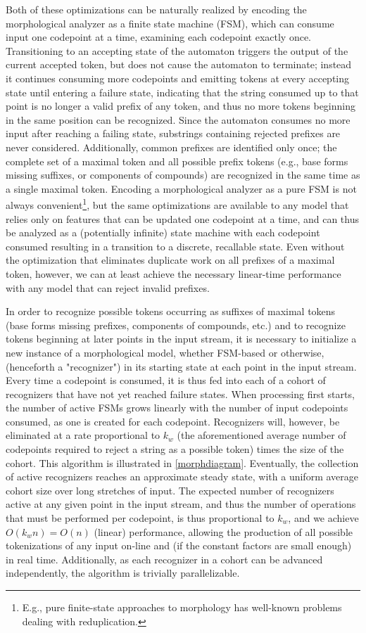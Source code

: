 Both of these optimizations can be naturally realized by encoding the morphological analyzer as a finite state machine (FSM), which can consume input one codepoint at a time, examining each codepoint exactly once. Transitioning to an accepting state of the automaton triggers the output of the current accepted token, but does not cause the automaton to terminate; instead it continues consuming more codepoints and emitting tokens at every accepting state until entering a failure state, indicating that the string consumed up to that point is no longer a valid prefix of any token, and thus no more tokens beginning in the same position can be recognized. Since the automaton consumes no more input after reaching a failing state, substrings containing rejected prefixes are never considered. Additionally, common prefixes are identified only once; the complete set of a maximal token and all possible prefix tokens (e.g., base forms missing suffixes, or components of compounds) are recognized in the same time as a single maximal token. Encoding a morphological analyzer as a pure FSM is not always convenient\footnote{E.g., pure finite-state approaches to morphology has well-known problems dealing with reduplication.}, but the same optimizations are available to any model that relies only on features that can be updated one codepoint at a time, and can thus be analyzed as a (potentially infinite) state machine with each codepoint consumed resulting in a transition to a discrete, recallable state. Even without the optimization that eliminates duplicate work on all prefixes of a maximal token, however, we can at least achieve the necessary linear-time performance with any model that can reject invalid prefixes.

In order to recognize possible tokens occurring as suffixes of maximal tokens (base forms missing prefixes, components of compounds, etc.) and to recognize tokens beginning at later points in the input stream, it is necessary to initialize a new instance of a morphological model, whether FSM-based or otherwise, (henceforth a "recognizer") in its starting state at each point in the input stream. Every time a codepoint is consumed, it is thus fed into each of a cohort of recognizers that have not yet reached failure states. When processing first starts, the number of active FSMs grows linearly with the number of input codepoints consumed, as one is created for each codepoint. Recognizers will, however, be eliminated at a rate proportional to $k_w$ (the aforementioned average number of codepoints required to reject a string as a possible token) times the size of the cohort. This algorithm is illustrated in \ref{morphdiagram}. Eventually, the collection of active recognizers reaches an approximate steady state, with a uniform average cohort size over long stretches of input. The expected number of recognizers active at any given point in the input stream, and thus the number of operations that must be performed per codepoint, is thus proportional to $k_w$, and we achieve $O(k_{w}n) = O(n)$ (linear) performance, allowing the production of all possible tokenizations of any input on-line and (if the constant factors are small enough) in real time. Additionally, as each recognizer in a cohort can be advanced independently, the algorithm is trivially parallelizable.

